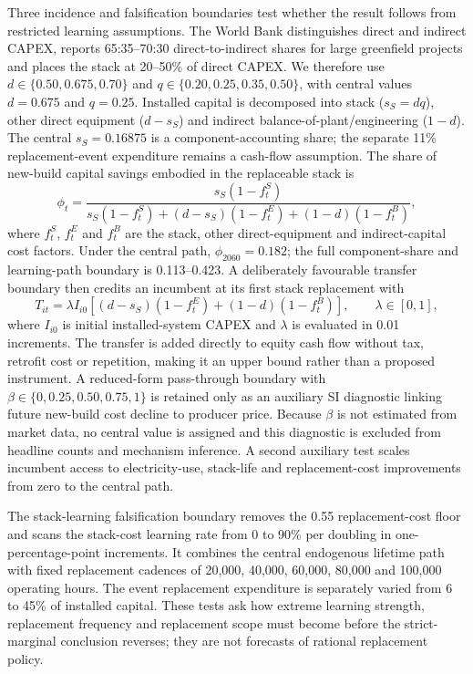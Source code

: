 \documentclass[11pt,a4paper]{article}
\begin{document}
Three incidence and falsification boundaries test whether the result follows from restricted learning assumptions. The World Bank distinguishes direct and indirect CAPEX, reports 65:35--70:30 direct-to-indirect shares for large greenfield projects and places the stack at 20--50\% of direct CAPEX\cite{worldbank2026}. We therefore use $d\in\{0.50,0.675,0.70\}$ and $q\in\{0.20,0.25,0.35,0.50\}$, with central values $d=0.675$ and $q=0.25$. Installed capital is decomposed into stack ($s_S=dq$), other direct equipment ($d-s_S$) and indirect balance-of-plant/engineering ($1-d$). The central $s_S=0.16875$ is a component-accounting share; the separate 11\% replacement-event expenditure remains a cash-flow assumption. The share of new-build capital savings embodied in the replaceable stack is
\begin{equation}
\phi_t=\frac{s_S(1-f^S_t)}{s_S(1-f^S_t)+(d-s_S)(1-f^E_t)+(1-d)(1-f^B_t)},
\label{eq:incidence}
\end{equation}
where $f^S_t$, $f^E_t$ and $f^B_t$ are the stack, other direct-equipment and indirect-capital cost factors. Under the central path, $\phi_{2060}=0.182$; the full component-share and learning-path boundary is 0.113--0.423. A deliberately favourable transfer boundary then credits an incumbent at its first stack replacement with
\begin{equation}
T_{it}=\lambda I_{i0}\left[(d-s_S)(1-f^E_t)+(1-d)(1-f^B_t)\right],
\qquad \lambda\in[0,1],
\label{eq:transfer}
\end{equation}
where $I_{i0}$ is initial installed-system CAPEX and $\lambda$ is evaluated in 0.01 increments. The transfer is added directly to equity cash flow without tax, retrofit cost or repetition, making it an upper bound rather than a proposed instrument. A reduced-form pass-through boundary with $\beta\in\{0,0.25,0.50,0.75,1\}$ is retained only as an auxiliary SI diagnostic linking future new-build cost decline to producer price. Because $\beta$ is not estimated from market data, no central value is assigned and this diagnostic is excluded from headline counts and mechanism inference. A second auxiliary test scales incumbent access to electricity-use, stack-life and replacement-cost improvements from zero to the central path.

The stack-learning falsification boundary removes the 0.55 replacement-cost floor and scans the stack-cost learning rate from 0 to 90\% per doubling in one-percentage-point increments. It combines the central endogenous lifetime path with fixed replacement cadences of 20,000, 40,000, 60,000, 80,000 and 100,000 operating hours. The event replacement expenditure is separately varied from 6 to 45\% of installed capital. These tests ask how extreme learning strength, replacement frequency and replacement scope must become before the strict-marginal conclusion reverses; they are not forecasts of rational replacement policy.
\end{document}

